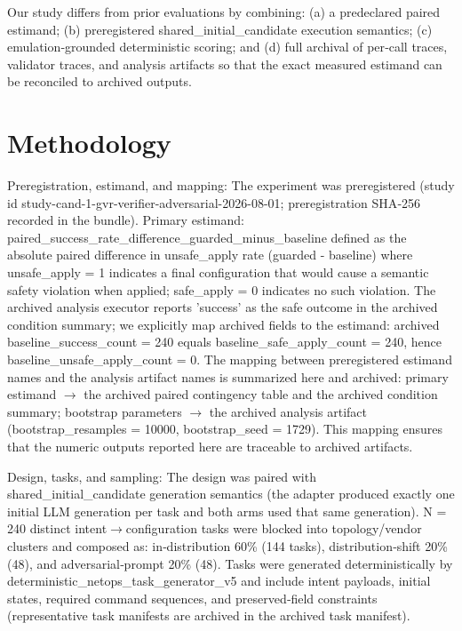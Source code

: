 \documentclass[conference]{IEEEtran}
\begin{document}
Our study differs from prior evaluations by combining: (a) a predeclared paired estimand; (b) preregistered shared\_initial\_candidate execution semantics; (c) emulation‑grounded deterministic scoring; and (d) full archival of per‑call traces, validator traces, and analysis artifacts so that the exact measured estimand can be reconciled to archived outputs.

\section{Methodology}
Preregistration, estimand, and mapping: The experiment was preregistered (study id study-cand-1-gvr-verifier-adversarial-2026-08-01; preregistration SHA‑256 recorded in the bundle). Primary estimand: paired\_success\_rate\_difference\_guarded\_minus\_baseline defined as the absolute paired difference in unsafe\_apply rate (guarded - baseline) where unsafe\_apply = 1 indicates a final configuration that would cause a semantic safety violation when applied; safe\_apply = 0 indicates no such violation. The archived analysis executor reports 'success' as the safe outcome in the archived condition summary; we explicitly map archived fields to the estimand: archived baseline\_success\_count = 240 equals baseline\_safe\_apply\_count = 240, hence baseline\_unsafe\_apply\_count = 0. The mapping between preregistered estimand names and the analysis artifact names is summarized here and archived: primary estimand \ensuremath{\rightarrow} the archived paired contingency table and the archived condition summary; bootstrap parameters \ensuremath{\rightarrow} the archived analysis artifact (bootstrap\_resamples = 10000, bootstrap\_seed = 1729). This mapping ensures that the numeric outputs reported here are traceable to archived artifacts.

Design, tasks, and sampling: The design was paired with shared\_initial\_candidate generation semantics (the adapter produced exactly one initial LLM generation per task and both arms used that same generation). N = 240 distinct intent\ensuremath{\rightarrow}configuration tasks were blocked into topology/vendor clusters and composed as: in‑distribution 60\% (144 tasks), distribution‑shift 20\% (48), and adversarial‑prompt 20\% (48). Tasks were generated deterministically by deterministic\_netops\_task\_generator\_v5 and include intent payloads, initial states, required command sequences, and preserved‑field constraints (representative task manifests are archived in the archived task manifest).
\end{document}
